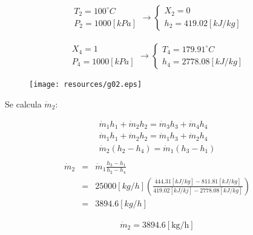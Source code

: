 \documentclass[letter,10pt]{article}
\begin{document}
\begin{enumerate}
\begin{eqnarray*}
    \begin{array}{c}
        T_2 = 100^\circ C \\
        P_2 = 1000[kPa]
    \end{array}
    \rightarrow
    \begin{cases}
        X_2 = 0 \\
        h_2 = 419.02[kJ/kg]
    \end{cases}
\end{eqnarray*}

\begin{eqnarray*}
    \begin{array}{c}
        X_4 = 1 \\
        P_4 = 1000[kPa]
    \end{array}
    \rightarrow
    \begin{cases}
        T_4 = 179.91^\circ C \\
        h_4 = 2778.08[kJ/kg]
    \end{cases}
\end{eqnarray*}

\begin{figure}[H]
\centering
\texttt{[image: resources/g02.eps]}
\end{figure}

Se calcula $\dot{m}_2$:

\begin{eqnarray*}
    \dot{m}_1 h_1 + \dot{m}_2 h_2 = \dot{m}_3 h_3 + \dot{m}_4 h_4 \\
    \dot{m}_1 h_1 + \dot{m}_2 h_2 = \dot{m}_1 h_3 + \dot{m}_2 h_4 \\
    \dot{m}_2 (h_2 - h_4) = \dot{m}_1 (h_3 - h_1) \\
\end{eqnarray*}
\begin{eqnarray*}
    \dot{m}_2 &=& \dot{m}_1\frac{h_3 - h_1}{h_2 - h_4} \\
              &=& 25000[kg/h]\left(
                  \frac{444.31[kJ/kg]-811.81[kJ/kg]}
                  {419.02[kJ/kj]-2778.08[kJ/kg]}
                  \right) \\
              &=& 3894.6[kg/h]
\end{eqnarray*}

\begin{equation*}
\boxed{
    \begin{array}{l}
        \dot{m}_2 = 3894.6[\text{kg}/\text{h}]
    \end{array}
}
\end{equation*}


\end{enumerate}
\end{document}
